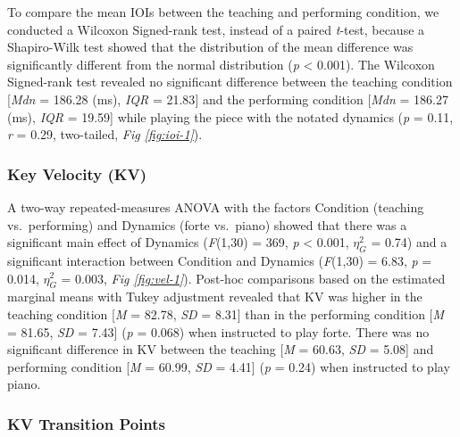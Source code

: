 \documentclass[
  man,floatsintext]{apa6}
\begin{document}
To compare the mean IOIs between the teaching and performing condition, we conducted a Wilcoxon Signed-rank test, instead of a paired \emph{t}-test, because a Shapiro-Wilk test showed that the distribution of the mean difference was significantly different from the normal distribution (\emph{p} \textless{} 0.001). The Wilcoxon Signed-rank test revealed no significant difference between the teaching condition {[}\emph{Mdn} = 186.28 (ms), \emph{IQR} = 21.83{]} and the performing condition {[}\emph{Mdn} = 186.27 (ms), \emph{IQR} = 19.59{]} while playing the piece with the notated dynamics (\emph{p} = 0.11, \emph{r} = 0.29, two-tailed, \emph{Fig \ref{fig:ioi-1}}).

\hypertarget{key-velocity-kv-1}{%
\subsubsection{Key Velocity (KV)}\label{key-velocity-kv-1}}

A two-way repeated-measures ANOVA with the factors Condition (teaching vs.~performing) and Dynamics (forte vs.~piano) showed that there was a significant main effect of Dynamics (\emph{F}(1,30) = 369, \emph{p} \textless{} 0.001, \(\eta_G^2\) = 0.74) and a significant interaction between Condition and Dynamics (\emph{F}(1,30) = 6.83, \emph{p} = 0.014, \(\eta_G^2\) = 0.003, \emph{Fig \ref{fig:vel-1}}). Post-hoc comparisons based on the estimated marginal means with Tukey adjustment revealed that KV was higher in the teaching condition {[}\emph{M} = 82.78, \emph{SD} = 8.31{]} than in the performing condition {[}\emph{M} = 81.65, \emph{SD} = 7.43{]} (\emph{p} = 0.068) when instructed to play forte. There was no significant difference in KV between the teaching {[}\emph{M} = 60.63, \emph{SD} = 5.08{]} and performing condition {[}\emph{M} = 60.99, \emph{SD} = 4.41{]} (\emph{p} = 0.24) when instructed to play piano.

\hypertarget{kv-transition-points}{%
\subsubsection{KV Transition Points}\label{kv-transition-points}}
\end{document}
